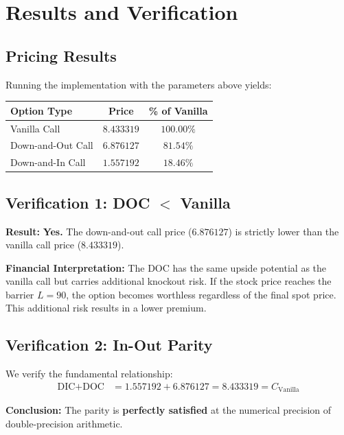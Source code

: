 \documentclass{report}
\begin{document}
\section{Results and Verification}

\subsection{Pricing Results}
Running the implementation with the parameters above yields:

\begin{center}
\begin{tabular}{lcc}
\toprule
\textbf{Option Type} & \textbf{Price} & \textbf{\% of Vanilla} \\
\midrule
Vanilla Call & $8.433319$ & $100.00\%$ \\
Down-and-Out Call & $6.876127$ & $81.54\%$ \\
Down-and-In Call & $1.557192$ & $18.46\%$ \\
\bottomrule
\end{tabular}
\end{center}

\subsection{Verification 1: DOC $<$ Vanilla}
\textbf{Result:} \textbf{Yes.} The down-and-out call price ($6.876127$) is strictly lower than the vanilla call price ($8.433319$).

\textbf{Financial Interpretation:} The DOC has the same upside potential as the vanilla call but carries additional knockout risk. If the stock price reaches the barrier $L = 90$, the option becomes worthless regardless of the final spot price. This additional risk results in a lower premium.

\subsection{Verification 2: In-Out Parity}
We verify the fundamental relationship:
\begin{align*}
\text{DIC} + \text{DOC} &= 1.557192 + 6.876127 = 8.433319 = C_{\text{Vanilla}}
\end{align*}

\textbf{Conclusion:} The parity is \textbf{perfectly satisfied} at the numerical precision of double-precision arithmetic.
\end{document}
